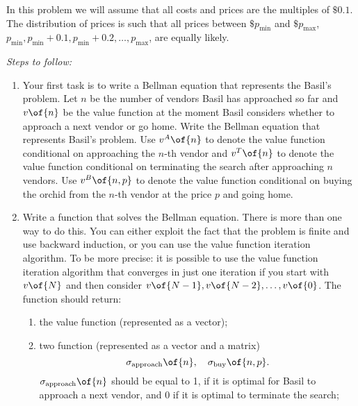 \documentclass[english,hyperref={pdftex,pdfpagemode=UseNone,hidelinks}]{tufte-handout}
\begin{document}
In this problem we will assume that all costs and prices are the multiples of $\$ 0.1$. The distribution of prices is such that all prices between $ \$ p_{\min}$ and $\$ p_{\max}$, $p_{\min},p_{\min}+0.1,p_{\min}+0.2,\ldots,p_{\max}$, are equally likely. 


\emph{Steps to follow:}
\begin{enumerate}
\item Your first task is to write a Bellman equation that represents the Basil's problem. Let $n$ be the number of vendors Basil has approached so far and $v\of{n}$ be the value function at the moment Basil considers whether to approach a next vendor or go home. Write the Bellman equation that represents Basil's problem. Use $v^A\of{n}$ to denote the value function conditional on approaching the $n$-th vendor and $v^T\of{n}$ to denote the value function conditional on terminating the search after approaching $n$ vendors. Use $v^B\of{n,p}$ to denote the value function conditional on buying the orchid from the $n$-th vendor at the price $p$ and going home. 

\item Write a function that solves the Bellman equation. There is more than one way to do this. You can either exploit the fact that the problem is finite and use backward induction, or you can use the value function iteration algorithm. To be more precise: it is possible to use the value function iteration algorithm that converges in just one iteration if you start with $v\of{N}$ and then consider $v\of{N-1},v\of{N-2},\ldots,v\of{0}$. 
  The function should return: \begin{enumerate} 
    \item the value function (represented as a vector); \item 
    two function (represented as a vector and a matrix) $$\sigma_{\text{approach}}\of{n},\quad\sigma_{\text{buy}}\of{n,p}.$$  
    $\sigma_{\text{approach}}\of{n}$ should be equal to 1, if it is optimal for Basil to approach a next vendor, and 0 if it is optimal to terminate the search;
    

\end{enumerate}
\end{enumerate}
\end{document}
